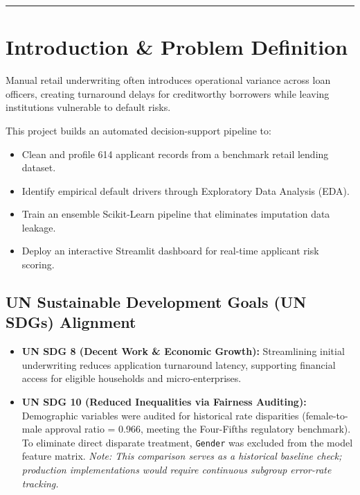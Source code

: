 \documentclass[11pt,a4paper]{article}
\begin{document}
\noindent\textcolor{rulecolor}{\rule{\textwidth}{0.6pt}}

\section{Introduction \& Problem Definition}
Manual retail underwriting often introduces operational variance across loan officers, creating turnaround delays for creditworthy borrowers while leaving institutions vulnerable to default risks.

This project builds an automated decision-support pipeline to:
\vspace{0.15cm}

\begin{itemize}
    \item Clean and profile 614 applicant records from a benchmark retail lending dataset.
    \item Identify empirical default drivers through Exploratory Data Analysis (EDA).
    \item Train an ensemble Scikit-Learn pipeline that eliminates imputation data leakage.
    \item Deploy an interactive Streamlit dashboard for real-time applicant risk scoring.
\end{itemize}

\subsection{UN Sustainable Development Goals (UN SDGs) Alignment}
\vspace{0.15cm}

\begin{itemize}
    \item \textbf{UN SDG 8 (Decent Work \& Economic Growth):} Streamlining initial underwriting reduces application turnaround latency, supporting financial access for eligible households and micro-enterprises.
    \item \textbf{UN SDG 10 (Reduced Inequalities via Fairness Auditing):} Demographic variables were audited for historical rate disparities (female-to-male approval ratio = 0.966, meeting the Four-Fifths regulatory benchmark). To eliminate direct disparate treatment, \texttt{Gender} was excluded from the model feature matrix. \textit{Note: This comparison serves as a historical baseline check; production implementations would require continuous subgroup error-rate tracking.}
\end{itemize}
\end{document}
